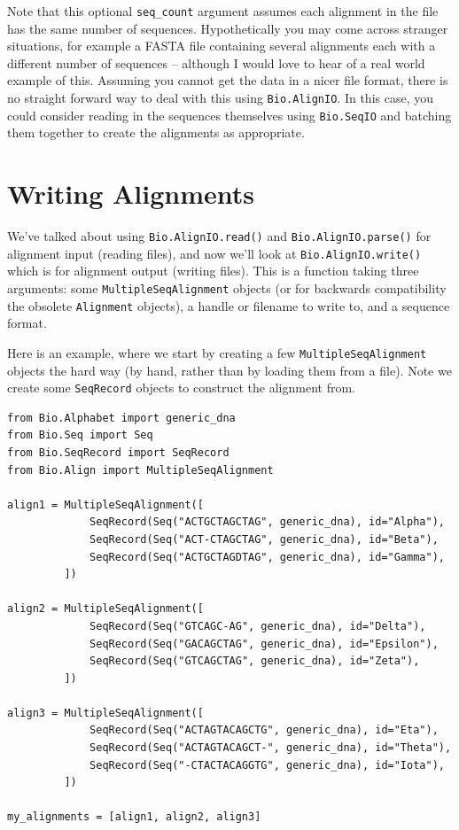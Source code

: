 \documentclass{report}
\begin{document}
Note that this optional \verb|seq_count| argument assumes each alignment in the file has the same number of sequences.  Hypothetically you may come across stranger situations, for example a FASTA file containing several alignments each with a different number of sequences -- although I would love to hear of a real world example of this.  Assuming you cannot get the data in a nicer file format, there is no straight forward way to deal with this using \verb|Bio.AlignIO|.  In this case, you could consider reading in the sequences themselves using \verb|Bio.SeqIO| and batching them together to create the alignments as appropriate.

\section{Writing Alignments}

We've talked about using \verb|Bio.AlignIO.read()| and \verb|Bio.AlignIO.parse()| for alignment input (reading files), and now we'll look at \verb|Bio.AlignIO.write()| which is for alignment output (writing files).  This is a function taking three arguments: some \verb|MultipleSeqAlignment| objects (or for backwards compatibility the obsolete \verb|Alignment| objects), a handle or filename to write to, and a sequence format.

Here is an example, where we start by creating a few \verb|MultipleSeqAlignment| objects the hard way (by hand, rather than by loading them from a file).
Note we create some \verb|SeqRecord| objects to construct the alignment from.

\begin{verbatim}
from Bio.Alphabet import generic_dna
from Bio.Seq import Seq
from Bio.SeqRecord import SeqRecord
from Bio.Align import MultipleSeqAlignment

align1 = MultipleSeqAlignment([
             SeqRecord(Seq("ACTGCTAGCTAG", generic_dna), id="Alpha"),
             SeqRecord(Seq("ACT-CTAGCTAG", generic_dna), id="Beta"),
             SeqRecord(Seq("ACTGCTAGDTAG", generic_dna), id="Gamma"),
         ])

align2 = MultipleSeqAlignment([
             SeqRecord(Seq("GTCAGC-AG", generic_dna), id="Delta"),
             SeqRecord(Seq("GACAGCTAG", generic_dna), id="Epsilon"),
             SeqRecord(Seq("GTCAGCTAG", generic_dna), id="Zeta"),
         ])

align3 = MultipleSeqAlignment([
             SeqRecord(Seq("ACTAGTACAGCTG", generic_dna), id="Eta"),
             SeqRecord(Seq("ACTAGTACAGCT-", generic_dna), id="Theta"),
             SeqRecord(Seq("-CTACTACAGGTG", generic_dna), id="Iota"),
         ])

my_alignments = [align1, align2, align3]
\end{verbatim}
\end{document}
